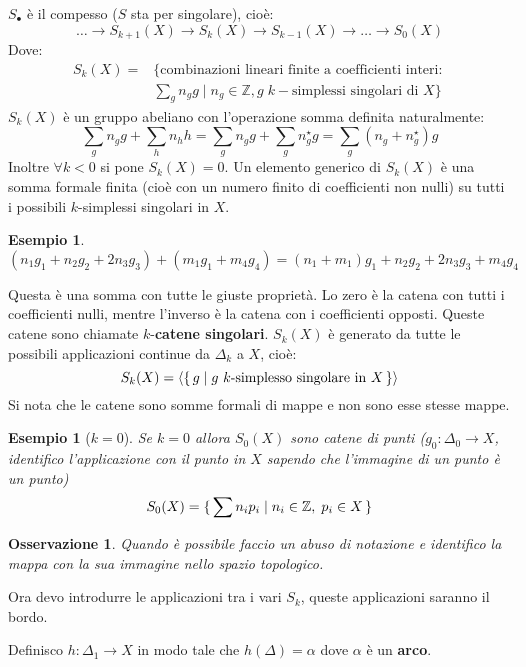 \documentclass[10pt, twoside=false, x11names]{scrbook}
\newtheorem{osservation}[theorem]{Osservazione}
\newtheorem{example}[theorem]{Esempio}
\newcommand{\Z}{\mathbb{Z}}
\begin{document}
$ S_\bullet $ è il compesso ($ S $ sta per singolare), cioè:
\[
  \dots \to S_{k+1}(X) \to S_k(X) \to S_{k-1}(X) \to \dots \to S_0(X)
\]
Dove:
\begin{align*}
  S_k(X) ={}& \{\text{combinazioni lineari finite a coefficienti interi: } \\
         & \sum_g n_g g \;|\; n_g \in \Z, g \; k-\text{simplessi singolari di } X \}
\end{align*}
$ S_k(X) $ è un gruppo abeliano con l'operazione somma definita naturalmente:
\[
  \sum_g n_g g + \sum_h n_h h =   \sum_g n_g g + \sum_g n_g^\star g = \sum_g (n_g + n_g^\star)g
\]
Inoltre $ \forall k < 0 $ si pone $ S_k(X) = 0 $. Un elemento generico di $ S_k(X) $
è una somma formale finita (cioè con un numero finito di coefficienti non nulli)
su tutti i possibili $ k $-simplessi singolari in $ X $.
\begin{example}
  \[
    (n_1 g_1 + n_2 g_2 + 2 n_3 g_3) + (m_1 g_1 + m_4 g_4) = (n_1 + m_1)g_1 + n_2 g_2 + 2 n_3 g_3 + m_4 g_4
  \]
\end{example}
Questa è una somma con tutte le giuste proprietà. Lo zero è la catena con tutti i coefficienti nulli,
mentre l'inverso è la catena con i coefficienti opposti.
Queste catene sono chiamate $ k $-\textbf{catene singolari}.
$ S_k(X) $ è generato da tutte le possibili applicazioni continue da $ \Delta_k $ a $ X $, cioè:
\[
  S_k(X) = \langle \set{g | g \text{ $ k $-simplesso singolare in $ X $}} \rangle
\]
Si nota che le catene sono somme formali di mappe e non sono esse stesse mappe.
\begin{example}[$ k = 0$]
  Se $ k = 0 $ allora $ S_0(X) $ sono catene di punti ($ g_0 : \Delta_0 \to X $, identifico l'applicazione
  con il punto in $ X $ sapendo che l'immagine di un punto è un punto)
  \[
    S_0(X) = \set { \sum n_i p_i | n_i \in \Z, \; p_i \in X}
  \]
\end{example}
\begin{osservation}
  Quando è possibile faccio un abuso di notazione e identifico la mappa con la sua immagine
  nello spazio topologico.
\end{osservation}

Ora devo introdurre le applicazioni tra i vari $ S_k $, queste applicazioni saranno il bordo.

Definisco $ h: \Delta_1 \to X $ in modo tale che $ h(\Delta) = \alpha $ dove $ \alpha $ è un \textbf{arco}.
\end{document}
